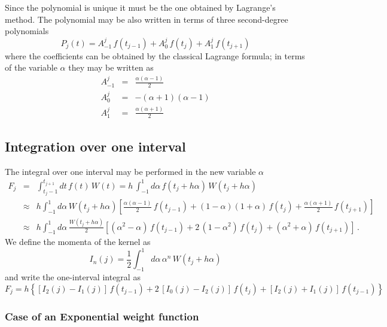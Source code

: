 Since the polynomial is unique it must be the one obtained by Lagrange's method. The polynomial may be also written in terms of three second-degree polynomials
\begin{equation}
  \label{Q:fgm-lagrange-polyn}
  P_{j}(t)= A^{j}_{-1} \,f(t_{j-1}) + A^{j}_{0} \,f(t_{j}) + A^{j}_{1} \,f(t_{j+1})
\end{equation}
where the coefficients can be obtained by the classical Lagrange formula; in terms of the variable $\alpha$ they may be written as 
\begin{eqnarray}
  \label{Q:fgm-lagrange-polyn-coeff}
  A^{j}_{-1}&=& \frac{\alpha(\alpha - 1)}{2} \nonumber \\
  A^{j}_{0} &=& -(\alpha + 1)(\alpha - 1)  \\
  A^{j}_{1} &=& \frac{\alpha(\alpha + 1)}{2} \nonumber 
\end{eqnarray}

\subsection{Integration over one interval}
\label{S:integr-one-interv}

The integral over one interval may be performed in the new variable $\alpha$
\begin{eqnarray*}
   F_{j}&=& \int_{t_{j}-1}^{t_{j+1}} dt \, f(t) \, W(t) = h\, \int_{-1}^{1} d\alpha \, f(t_{j} + h \alpha) \, W(t_{j} + h \alpha) \\
& \approx& h \int_{-1}^{1} d\alpha \, W(t_{j} + h\alpha) \left[ \frac{\alpha(\alpha-1)}{2} \, f(t_{j-1}) + (1-\alpha)(1+\alpha) \, f(t_{j}) + \frac{\alpha(\alpha+1)}{2} \, f(t_{j+1}) \right]\\
& \approx& h \int_{-1}^{1} d\alpha \, \frac{W(t_{j} + h\alpha)}{2} \left[ (\alpha^{2} -\alpha )\, f(t_{j-1}) + 2\,(1 -\alpha^{2} ) \, f(t_{j}) + (\alpha^{2}+\alpha) \, f(t_{j+1}) \right] \,.
\end{eqnarray*}
%
We define the momenta of the kernel as
\begin{equation*}
  I_{n}(j)= \frac{1}{2} \int_{-1}^{1} d \alpha \, \alpha^{n}\, W(t_{j}+h\alpha)
\end{equation*}
and write the one-interval integral as
\begin{equation}
  \label{Q:fgm-one-interv-integ}
  F_{j}= h \left\{ [I_{2}(j)-I_{1}(j)]\,f(t_{j-1}) + 2\,[I_{0}(j)-I_{2}(j)]\,f(t_{j}) + [I_{2}(j)+I_{1}(j)]\,f(t_{j-1})\right\}
\end{equation}

\subsubsection{Case of an Exponential weight function}
\label{S:expon-weigth-funct}

